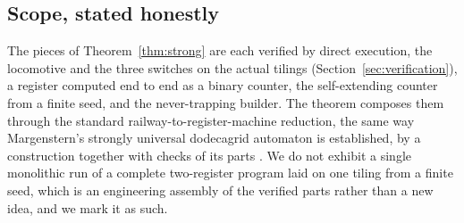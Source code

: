 \subsection{Scope, stated honestly}

The pieces of Theorem~\ref{thm:strong} are each verified by direct execution, the locomotive and the three
switches on the actual tilings (Section~\ref{sec:verification}), a register computed end to end as a binary
counter, the self-extending counter from a finite seed, and the never-trapping builder. The theorem composes
them through the standard railway-to-register-machine reduction, the same way Margenstern's strongly universal
dodecagrid automaton is established, by a construction together with checks of its parts
\cite{margenstern2021dodeca5}. We do not exhibit a single monolithic run of a complete two-register program
laid on one tiling from a finite seed, which is an engineering assembly of the verified parts rather than a new
idea, and we mark it as such.
